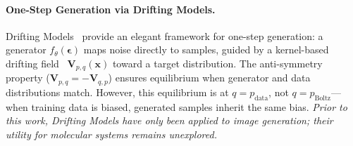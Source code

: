 \documentclass[11pt]{article}
\newcommand{\bx}{\mathbf{x}}
\newcommand{\bV}{\mathbf{V}}
\newcommand{\beps}{\boldsymbol{\epsilon}}
\newcommand{\pboltz}{p_{\text{Boltz}}}
\newcommand{\pdata}{p_{\text{data}}}
\begin{document}
\paragraph{One-Step Generation via Drifting Models.}
Drifting Models~\citep{deng2026drifting} provide an elegant framework for one-step generation: a generator $f_\theta(\beps)$ maps noise directly to samples, guided by a kernel-based drifting field~\citep{genton2001classes} $\bV_{p,q}(\bx)$ toward a target distribution.
The anti-symmetry property ($\bV_{p,q} = -\bV_{q,p}$) ensures equilibrium when generator and data distributions match.
However, this equilibrium is at $q = \pdata$, not $q = \pboltz$---when training data is biased, generated samples inherit the same bias.
\emph{Prior to this work, Drifting Models have only been applied to image generation; their utility for molecular systems remains unexplored.}
\end{document}
